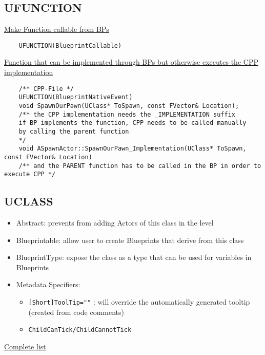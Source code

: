         \subsection{UFUNCTION}
            \uline{Make Function callable from BPs}
            \begin{lstlisting}
    UFUNCTION(BlueprintCallable)
            \end{lstlisting}
\smallskip
            \uline{Function that can be implemented through BPs but otherwise executes the CPP implementation}
            \begin{lstlisting}
    /** CPP-File */
    UFUNCTION(BlueprintNativeEvent)
    void SpawnOurPawn(UClass* ToSpawn, const FVector& Location);
    /** the CPP implementation needs the _IMPLEMENTATION suffix
    if BP implements the function, CPP needs to be called manually
    by calling the parent function
    */
    void ASpawnActor::SpawnOurPawn_Implementation(UClass* ToSpawn, const FVector& Location)
    /** and the PARENT function has to be called in the BP in order to execute CPP */
            \end{lstlisting}

        \subsection{UCLASS}
            \begin{itemize}
                \item Abstract: prevents from adding Actors of this class in the level
                \item Blueprintable: allow user to create Blueprints that derive from this class
                \item BlueprintType: expose the class as a type that can be used for variables in Blueprints
                \item Metadata Specifiers:
                \begin{itemize}
                    \item \colorbox{mygray}{\lstinline{[Short]ToolTip=""}} : will override the automatically generated tooltip (created from code comments)
                    \item \colorbox{mygray}{\lstinline{ChildCanTick/ChildCannotTick}}
                \end{itemize}
            \end{itemize}
            \href{https://docs.unrealengine.com/en-US/Programming/UnrealArchitecture/Reference/Classes/Specifiers/index.html}{Complete list}


